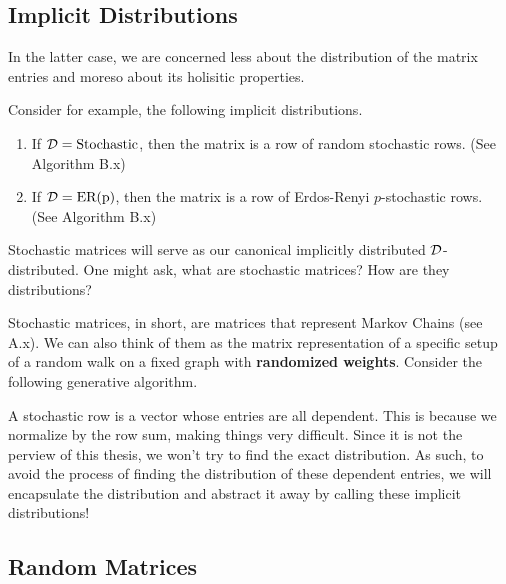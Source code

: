 
\subsection{Implicit Distributions}

In the latter case, we are concerned less about the distribution of the matrix entries and moreso about its holisitic properties.

Consider for example, the following implicit distributions.

\begin{enumerate}
\item If $\mathcal{D} = \text{Stochastic}$, then the matrix is a row of random stochastic rows. (See Algorithm B.x)
\item If $\mathcal{D} = \text{ER(p)}$, then the matrix is a row of Erdos-Renyi $p$-stochastic rows. (See Algorithm B.x)
\end{enumerate}


Stochastic matrices will serve as our canonical implicitly distributed $\mathcal{D}$-distributed. One might ask, what are stochastic matrices? How are they distributions?

Stochastic matrices, in short, are matrices that represent Markov Chains (see A.x).
We can also think of them as the matrix representation of a specific setup of a random walk on a fixed graph with \textbf{randomized weights}. Consider the following generative algorithm.

\ALGstochrow

\ALGstoch

A stochastic row is a vector whose entries are all dependent. This is because we normalize by the row sum, making things very difficult. Since it is not the perview of this thesis, we won't try to find
the exact distribution.
As such, to avoid the process of finding the distribution of these dependent entries, we will encapsulate the distribution and abstract it away by calling these implicit distributions!



\subsection{Random Matrices}

